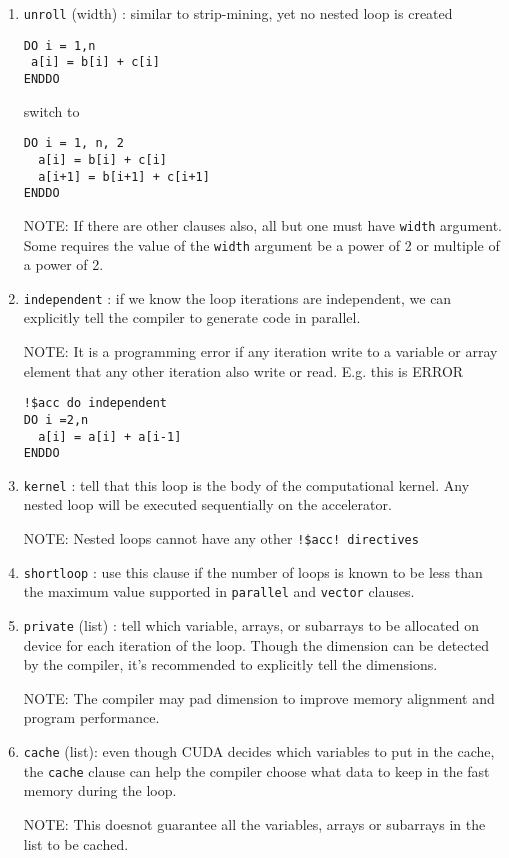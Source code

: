 \begin{enumerate}
\begin{lstlisting}
\end{lstlisting}


\item \verb!unroll! (width) : similar to strip-mining, yet no nested
  loop is created
\begin{lstlisting}
DO i = 1,n
 a[i] = b[i] + c[i]
ENDDO
\end{lstlisting}
switch to
\begin{lstlisting}
DO i = 1, n, 2
  a[i] = b[i] + c[i]
  a[i+1] = b[i+1] + c[i+1]
ENDDO
\end{lstlisting}

NOTE: If there are other clauses also, all but one must have
\verb!width! argument. Some requires the value of the \verb!width!
argument be a power of 2 or multiple of a power of 2. 

\item \verb!independent! : if we know the loop iterations are
  independent, we can explicitly tell the compiler to generate code in
  parallel. 

NOTE: It is a programming error if any iteration write to a variable
or array element that any other iteration also write or
read. E.g. this is ERROR
\begin{lstlisting}
!$acc do independent 
DO i =2,n
  a[i] = a[i] + a[i-1]
ENDDO
\end{lstlisting}

\item \verb!kernel! : tell that this loop is the body of the
  computational kernel. Any nested loop will be executed sequentially
  on the accelerator. 

NOTE: Nested loops cannot have any other \verb.!$acc! directives. 

\item \verb!shortloop! : use this clause if the number of loops is
  known to be less than the maximum value supported in \verb!parallel!
  and \verb!vector! clauses. 

\item \verb!private! (list) : tell which variable, arrays, or
  subarrays to be allocated on device for each iteration of the
  loop. Though the dimension can be detected by the compiler, it's
  recommended to explicitly tell the dimensions.

NOTE: The compiler may pad dimension to improve memory alignment and
program performance. 
\item \verb!cache! (list): even though CUDA decides which variables to
  put in the cache, the \verb!cache! clause can help the compiler
  choose what data to keep in the fast memory during the loop. 

NOTE: This doesnot guarantee all the variables, arrays or subarrays in
the list to be cached. 
\end{enumerate}

